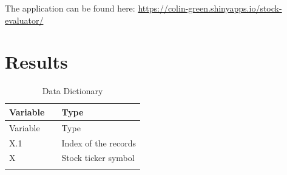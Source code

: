 \documentclass[11pt,]{article}
\begin{document}
The application can be found here:
\url{https://colin-green.shinyapps.io/stock-evaluator/} \newpage

\hypertarget{results}{%
\section{Results}\label{results}}

\begin{longtable}[]{@{}lll@{}}
\caption{Data Dictionary}\tabularnewline
\toprule
\begin{minipage}[b]{0.19\columnwidth}\raggedright
Variable\strut
\end{minipage} & \begin{minipage}[b]{0.10\columnwidth}\raggedright
\strut
\end{minipage} & \begin{minipage}[b]{0.62\columnwidth}\raggedright
Type\strut
\end{minipage}\tabularnewline
\midrule
\endfirsthead
\toprule
\begin{minipage}[b]{0.19\columnwidth}\raggedright
Variable\strut
\end{minipage} & \begin{minipage}[b]{0.10\columnwidth}\raggedright
\strut
\end{minipage} & \begin{minipage}[b]{0.62\columnwidth}\raggedright
Type\strut
\end{minipage}\tabularnewline
\midrule
\endhead
\begin{minipage}[t]{0.19\columnwidth}\raggedright
X.1\strut
\end{minipage} & \begin{minipage}[t]{0.10\columnwidth}\raggedright
\strut
\end{minipage} & \begin{minipage}[t]{0.62\columnwidth}\raggedright
Index of the records\strut
\end{minipage}\tabularnewline
\begin{minipage}[t]{0.19\columnwidth}\raggedright
X\strut
\end{minipage} & \begin{minipage}[t]{0.10\columnwidth}\raggedright
\strut
\end{minipage} & \begin{minipage}[t]{0.62\columnwidth}\raggedright
Stock ticker symbol\strut
\end{minipage}\tabularnewline
\begin{minipage}[t]{0.19\columnwidth}\raggedright

\end{minipage}
\end{longtable}
\end{document}
